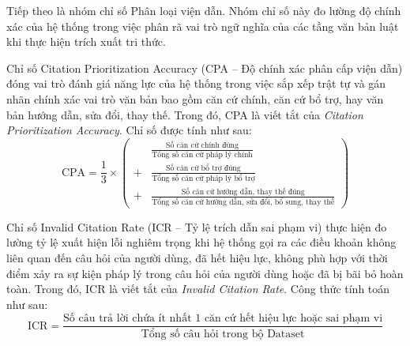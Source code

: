 \documentclass[../DoAn.tex]{subfiles}
\begin{document}
Tiếp theo là nhóm chỉ số Phân loại viện dẫn. Nhóm chỉ số này đo lường độ chính xác của hệ thống trong việc phân rã vai trò ngữ nghĩa của các tầng văn bản luật khi thực hiện trích xuất tri thức.

Chỉ số Citation Prioritization Accuracy (CPA -- Độ chính xác phân cấp viện dẫn) đóng vai trò đánh giá năng lực của hệ thống trong việc sắp xếp trật tự và gán nhãn chính xác vai trò văn bản bao gồm căn cứ chính, căn cứ bổ trợ, hay văn bản hướng dẫn, sửa đổi, thay thế. Trong đó, CPA là viết tắt của \textit{Citation Prioritization Accuracy}. Chỉ số được tính như sau: 
\begin{equation}
\label{eq:cpa_metric}
\text{CPA} = \frac{1}{3} \times \left( \begin{aligned}
    &\frac{\text{Số căn cứ chính đúng}}{\text{Tổng số căn cứ pháp lý chính}} \\
    + &\frac{\text{Số căn cứ bổ trợ đúng}}{\text{Tổng số căn cứ pháp lý bổ trợ}} \\
    + &\frac{\text{Số căn cứ hướng dẫn, thay thế đúng}}{\text{Tổng số căn cứ hướng dẫn, sửa đổi, bổ sung, thay thế}}
\end{aligned} \right)
\end{equation}

Chỉ số Invalid Citation Rate (ICR -- Tỷ lệ trích dẫn sai phạm vi) thực hiện đo lường tỷ lệ xuất hiện lỗi nghiêm trọng khi hệ thống gọi ra các điều khoản không liên quan đến câu hỏi của người dùng, đã hết hiệu lực, không phù hợp với thời điểm xảy ra sự kiện pháp lý trong câu hỏi của người dùng hoặc đã bị bãi bỏ hoàn toàn. Trong đó, ICR là viết tắt của \textit{Invalid Citation Rate}. Công thức tính toán như sau:
\begin{equation}
\label{eq:icr_metric}
\text{ICR} = \frac{\text{Số câu trả lời chứa ít nhất 1 căn cứ hết hiệu lực hoặc sai phạm vi}}{\text{Tổng số câu hỏi trong bộ Dataset}}
\end{equation}
\end{document}
